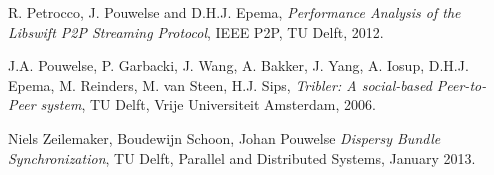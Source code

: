 \documentclass[pdftex, 10pt, a4paper]{report}
\begin{document}
\pagestyle{fancy}
\fancyhead{}
\fancyhead[LE, LO] {\today}



\tableofcontents

\pagebreak


\begin{thebibliography}{9}

   R. Petrocco, J. Pouwelse and D.H.J. Epema,
  \emph{Performance Analysis of the Libswift P2P Streaming Protocol},
  IEEE P2P, TU Delft,
  2012.

   J.A. Pouwelse, P. Garbacki, J. Wang, A. Bakker, J. Yang, A. Iosup, D.H.J. Epema, M. Reinders, M. van Steen, H.J. Sips,
  \emph{Tribler: A social-based Peer-to-Peer system},
  TU Delft, Vrije Universiteit Amsterdam,
  2006.

   Niels Zeilemaker, Boudewijn Schoon, Johan Pouwelse
  \emph{Dispersy Bundle Synchronization},
  TU Delft, Parallel and Distributed Systems,
  January 2013.


\end{thebibliography}
\end{document}
